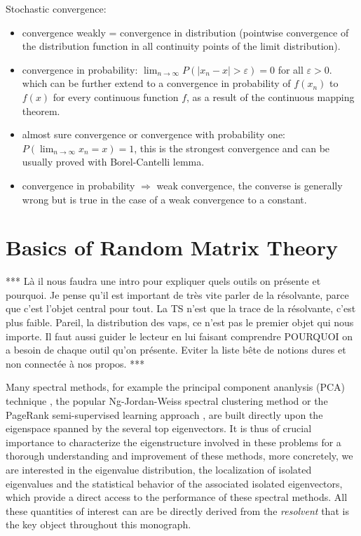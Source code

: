 \documentclass[MAL,biber]{nowfnt} %
\newcommand{\RED}{\color[rgb]{0.70,0,0}}
\begin{document}
Stochastic convergence:
\begin{itemize}
	\item convergence weakly = convergence in distribution (pointwise convergence of the distribution function in all continuity points of the limit distribution).
	\item convergence in probability: $\lim_{n \to \infty} P(|x_n - x| > \varepsilon) = 0$ for all $\varepsilon > 0$. which can be further extend to a convergence in probability of $f(x_n)$ to $f(x)$ for every continuous function $f$, as a result of the continuous mapping theorem.
	\item almost sure convergence or convergence with probability one: $P(\lim_{n \to \infty} x_n = x) = 1$, this is the strongest convergence and can be usually proved with Borel-Cantelli lemma.
	\item convergence in probability $\Rightarrow$ weak convergence, the converse is generally wrong but is true in the case of a weak convergence to a constant.
\end{itemize}


\chapter{Basics of Random Matrix Theory}
\label{chap:basis-of-RMT}

{\RED*** Là il nous faudra une intro pour expliquer quels outils on présente et pourquoi. Je pense qu'il est important de très vite parler de la résolvante, parce que c'est l'objet central pour tout. La TS n'est que la trace de la résolvante, c'est plus faible. Pareil, la distribution des vaps, ce n'est pas le premier objet qui nous importe. Il faut aussi guider le lecteur en lui faisant comprendre POURQUOI on a besoin de chaque outil qu'on présente. Eviter la liste bête de notions dures et non connectée à nos propos. ***}

Many spectral methods, for example the principal component ananlysis (PCA) technique \citep{wold1987principal}, the popular Ng-Jordan-Weiss spectral clustering method \citep{ng2002spectral} or the PageRank semi-supervised learning approach \citep{avrachenkov2012generalized}, are built directly upon the eigenspace spanned by the several top eigenvectors. It is thus of crucial importance to characterize the eigenstructure involved in these problems for a thorough understanding and improvement of these methods, more concretely, we are interested in the eigenvalue distribution, the localization of isolated eigenvalues and the statistical behavior of the associated isolated eigenvectors, which provide a direct access to the performance of these spectral methods. All these quantities of interest can are be directly derived from the \emph{resolvent} that is the key object throughout this monograph.
\end{document}
